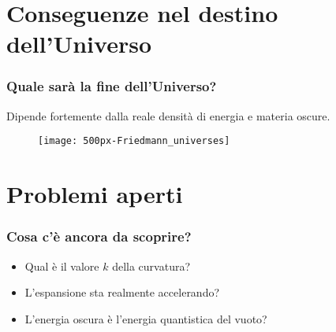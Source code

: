 \section[Conseguenze]{Conseguenze nel destino dell'Universo}

\begin{frame}
  \frametitle{Quale sarà la fine dell'Universo?}
  Dipende fortemente dalla reale densità di energia e materia oscure.
  \begin{figure}
    \centering
    \texttt{[image: 500px-Friedmann\_universes]}
  \end{figure}
\end{frame}

\section{Problemi aperti}

\begin{frame}
  \frametitle{Cosa c'è ancora da scoprire?}
  \begin{itemize}[<+->]
  \item Qual è il valore $k$ della curvatura?
  \item L'espansione sta realmente accelerando?
  \item L'energia oscura è l'energia quantistica del vuoto?
  \end{itemize}
\end{frame}

